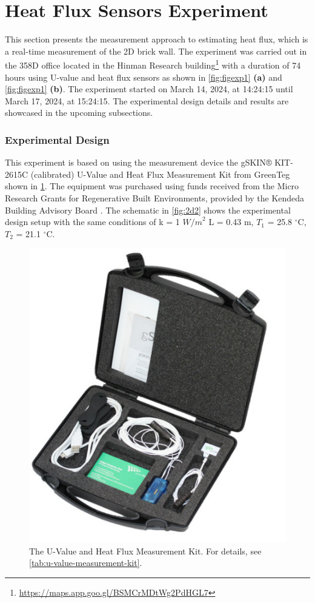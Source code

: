 \section{Heat Flux Sensors Experiment}


This section presents the measurement approach to estimating heat flux, which is a real-time measurement of the 2D brick wall. The experiment was carried out in the 358D office located in the Hinman Research building\footnote{\url{https://maps.app.goo.gl/BSMCrMDtWg2PdHGL7}} with a duration of 74 hours using \gls{U}-value and heat flux sensors as shown in \ref{fig:figexp1} \textbf{(a)} and \ref{fig:figexp1} \textbf{(b)}. The experiment started on March 14, 2024, at 14:24:15 until March 17, 2024, at 15:24:15. 
The experimental design details and results are showcased in the upcoming subsections.





 
\subsubsection{Experimental Design}
 This experiment is based on using the measurement device the gSKIN® KIT-2615C (calibrated) U-Value and Heat Flux Measurement Kit from GreenTeg  \cite{greenteg} shown in \ref{fig:toolkit}. The equipment was purchased using funds received from the Micro Research Grants for Regenerative Built Environments, provided by the Kendeda Building Advisory Board \cite{kendeda}.
 The schematic in \cref{fig:2d2} shows the experimental design setup with the same conditions of k  = 1 ${W/m}^2$ 
L = 0.43 m,
$T_1$ = 25.8 $^\circ \text{C}$, 
$T_2$  = 21.1  $^\circ \text{C}$.




\begin{figure}[tbh]
     \centering
    \includegraphics[width=0.5\linewidth]{Figures/greenteg.png}
     \caption[U-value measurement Kit]{The U-Value and Heat Flux Measurement Kit. For details, see \cref{tab:u-value-measurement-kit}.}
   \label{fig:toolkit}
 \end{figure}







